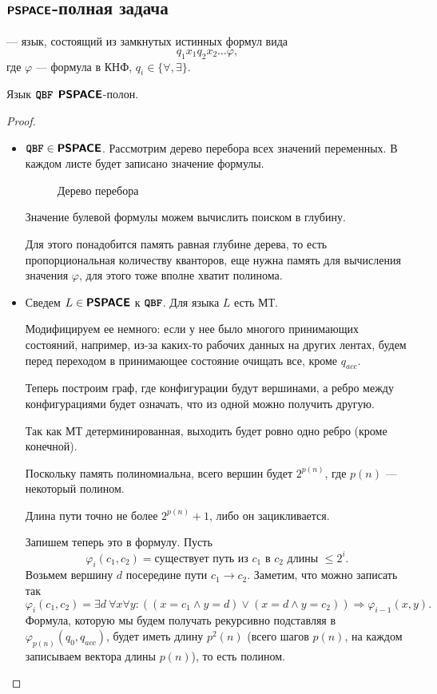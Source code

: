 \subsection{$ \textmd{\textbf{\textsf{PSPACE}}}$-полная задача}
\begin{defn}\index{$\QBF$}
	 --- язык, состоящий из замкнутых истинных формул вида \[
	q_1 x_1 q_2 x_2 \ldots \varphi 
	,\]    
	где $ \varphi $ --- формула в КНФ, $ q_i \in \{ \forall , \exists \}$.
\end{defn}
\begin{thm}
	Язык $ \QBF$ $ \textmd{\textbf{\textsf{PSPACE}}} $-полон.
\end{thm}
\begin{proof}
	\begin{itemize}
		\item $ {{\textbf{\texttt{QBF}}}} \in \textmd{\textbf{\textsf{PSPACE}}}$. Рассмотрим дерево перебора всех значений переменных. В каждом листе будет записано значение формулы.
	\begin{figure}[ht]
		\centering
		\caption{Дерево перебора}
		\label{fig:qbf-tree}
	\end{figure}
	Значение булевой формулы можем вычислить поиском в глубину.
	
	Для этого понадобится память равная глубине дерева, то есть пропорциональная количеству кванторов, еще нужна память для вычисления значения $ \varphi $, для этого тоже вполне хватит полинома.
	
    \item Сведем $ L \in \textmd{\textbf{\textsf{PSPACE}}}$ к $ \QBF$. Для языка  $ L$ есть МТ. 
    
    Модифицируем ее немного: если у нее было многого принимающих состояний, например, из-за каких-то рабочих данных на других лентах, будем перед переходом в принимающее состояние очищать все, кроме $ q_{acc}$.

	Теперь построим граф, где конфигурации будут вершинами, а ребро между конфигурациями будет означать, что из одной можно получить другую.

	 Так как МТ детерминированная, выходить будет ровно одно ребро (кроме конечной).

	 Поскольку память полиномиальна, всего вершин будет $ 2^{p(n)}$, где $ p(n)$ --- некоторый полином.

	 Длина пути точно не более $ 2^{p(n)}+1$, либо он зацикливается.

	 Запишем теперь это в формулу.
	 Пусть
	 \[
		 \varphi_i (c_1, c_2) = \text{существует путь из } c_1 \text{ в } c_2 \text{ длины } \le 2^{i}
	 .\] 
	 Возьмем вершину $ d$ посередине пути $ c_1 \to c_2$. Заметим, что можно записать так
	 \[
		 \varphi_i(c_1, c_2) = \exists d  ~\forall x \forall y \colon   \left( (x = c_1 \wedge  y = d) \vee (x = d \wedge  y = c_2) \right)  \Longrightarrow \varphi _{i-1}(x, y)
	 .\] 
	 Формула, которую мы будем получать рекурсивно подставляя в $ \varphi _{p(n)}(q_0, q_{acc})$, будет иметь длину $ p^2(n)$ (всего шагов $p(n)$, на каждом записываем вектора длины $p(n)$), то есть полином.


\end{itemize}
\end{proof}
